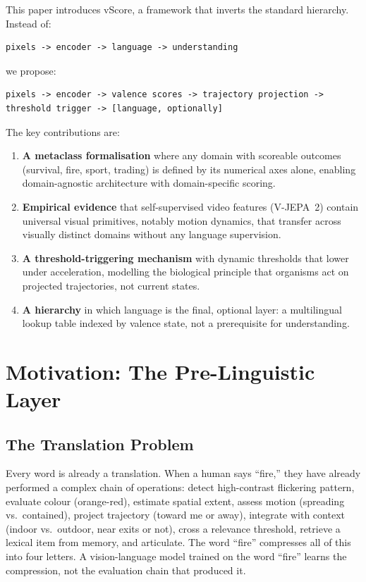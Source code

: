\documentclass[11pt]{article}
\begin{document}
This paper introduces vScore, a framework that inverts the standard hierarchy. Instead of:

\begin{lstlisting}[language={}]
pixels -> encoder -> language -> understanding
\end{lstlisting}

\noindent we propose:

\begin{lstlisting}[language={}]
pixels -> encoder -> valence scores -> trajectory projection -> threshold trigger -> [language, optionally]
\end{lstlisting}

The key contributions are:

\begin{enumerate}
    \item \textbf{A metaclass formalisation} where any domain with scoreable outcomes (survival, fire, sport, trading) is defined by its numerical axes alone, enabling domain-agnostic architecture with domain-specific scoring.

    \item \textbf{Empirical evidence} that self-supervised video features (V-JEPA~2) contain universal visual primitives, notably motion dynamics, that transfer across visually distinct domains without any language supervision.

    \item \textbf{A threshold-triggering mechanism} with dynamic thresholds that lower under acceleration, modelling the biological principle that organisms act on projected trajectories, not current states.

    \item \textbf{A hierarchy} in which language is the final, optional layer: a multilingual lookup table indexed by valence state, not a prerequisite for understanding.
\end{enumerate}

\section{Motivation: The Pre-Linguistic Layer}

\subsection{The Translation Problem}

Every word is already a translation. When a human says ``fire,'' they have already performed a complex chain of operations: detect high-contrast flickering pattern, evaluate colour (orange-red), estimate spatial extent, assess motion (spreading vs.\ contained), project trajectory (toward me or away), integrate with context (indoor vs.\ outdoor, near exits or not), cross a relevance threshold, retrieve a lexical item from memory, and articulate. The word ``fire'' compresses all of this into four letters. A vision-language model trained on the word ``fire'' learns the compression, not the evaluation chain that produced it.
\end{document}
